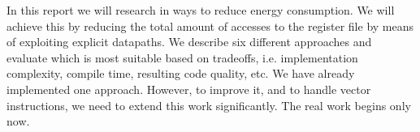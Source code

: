 
In this report we will research in ways to reduce energy consumption. We will achieve this by reducing the total amount of accesses to the register file by means of exploiting explicit datapaths. We describe six different approaches and evaluate which is most suitable based on tradeoffs, i.e. implementation complexity, compile time, resulting code quality, etc. We have already implemented one approach. However, to improve it, and to handle vector instructions, we need to extend this work significantly. The real work begins only now. 

\vspace{10mm}
 \keywords